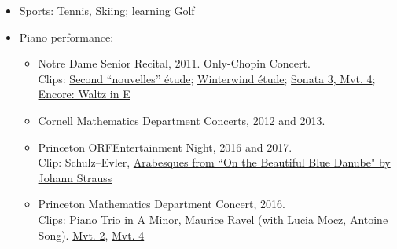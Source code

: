\documentclass[letterpaper,11pt]{article}
\begin{document}
\begin{itemize}
\item Sports: Tennis, Skiing; learning Golf
\item Piano performance:
\begin{itemize}


\item Notre Dame Senior Recital, 2011. Only-Chopin Concert. 
\\ Clips: \href{https://www.facebook.com/mark.cerenzia.90/videos/vb.35108657/10100397230349342/?type=3}{Second ``nouvelles'' \'{e}tude}; \href{https://www.facebook.com/mark.cerenzia.90/videos/vb.35108657/10100397251901152/?type=3}{Winterwind \'{e}tude}; \href{https://www.facebook.com/mark.cerenzia.90/videos/vb.35108657/10100397305089562/?type=3}{Sonata 3, Mvt. 4}; \href{https://www.facebook.com/mark.cerenzia.90/videos/vb.35108657/10100397330358922/?type=3}{Encore: Waltz in E}

\item Cornell Mathematics Department Concerts, 2012 and 2013.

\item Princeton ORFEntertainment Night, 2016 and 2017. \\ Clip: Schulz--Evler, \href{https://www.youtube.com/watch?v=pOAiON-sooA&index=2&list=PLwpFe8W22NfXC8-t3SJXgK-XChBY9vOAQ}{Arabesques from ``On the Beautiful Blue Danube" by Johann Strauss}
\item Princeton Mathematics Department Concert, 2016. \\
Clips: Piano Trio in A Minor, Maurice Ravel (with Lucia Mocz, Antoine Song). \href{https://www.facebook.com/mark.cerenzia.90/videos/vb.35108657/10100854009195872/?type=3}{Mvt. 2}, \href{https://www.facebook.com/mark.cerenzia.90/videos/vb.35108657/10100855055808452/?type=3}{Mvt. 4}
\end{itemize}
\end{itemize}
\end{document}
